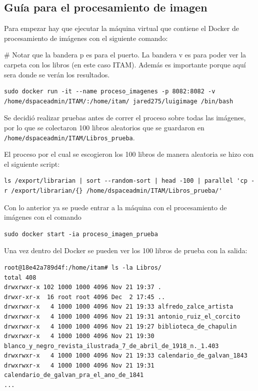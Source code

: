 \subsection{Guía para  el procesamiento de imagen}

Para empezar hay que ejecutar la máquina virtual que contiene el Docker de procesamiento de imágenes con el siguiente comando:


\# Notar que la bandera \-p es para el puerto. La bandera \-v es para poder ver la carpeta con los libros (en este caso ITAM). Además es importante porque aquí sera donde se verán los resultados.
\begin{lstlisting}
sudo docker run -it --name proceso_imagenes -p 8082:8082 -v /home/dspaceadmin/ITAM/:/home/itam/ jared275/luigimage /bin/bash
\end{lstlisting}

Se decidió realizar pruebas antes de correr el proceso sobre todas las imágenes, por lo que se colectaron 100 libros aleatorios que se guardaron en \texttt{/home/dspaceadmin/ITAM/Libros\_prueba}.

El proceso por el cual se escogieron los 100 libros de manera aleatoria se hizo con el siguiente script:

\begin{lstlisting}
ls /export/librarian | sort --random-sort | head -100 | parallel 'cp -r /export/librarian/{} /home/dspaceadmin/ITAM/Libros_prueba/'
\end{lstlisting}

Con lo anterior ya se puede entrar a la máquina con el procesamiento de imágenes con el comando 

\begin{lstlisting}
sudo docker start -ia proceso_imagen_prueba
\end{lstlisting}

Una vez dentro del Docker se pueden ver  los 100 libros de prueba con la salida:

\begin{lstlisting}
root@18e42a789d4f:/home/itam# ls -la Libros/        
total 408
drwxrwxr-x 102 1000 1000 4096 Nov 21 19:37 .
drwxr-xr-x  16 root root 4096 Dec  2 17:45 ..
drwxrwxr-x   4 1000 1000 4096 Nov 21 19:33 alfredo_zalce_artista
drwxrwxr-x   4 1000 1000 4096 Nov 21 19:31 antonio_ruiz_el_corcito
drwxrwxr-x   4 1000 1000 4096 Nov 21 19:27 biblioteca_de_chapulin
drwxrwxr-x   4 1000 1000 4096 Nov 21 19:30 blanco_y_negro_revista_ilustrada_7_de_abril_de_1918_n._1.403
drwxrwxr-x   4 1000 1000 4096 Nov 21 19:33 calendario_de_galvan_1843
drwxrwxr-x   4 1000 1000 4096 Nov 21 19:31 calendario_de_galvan_pra_el_ano_de_1841
...
\end{lstlisting}

